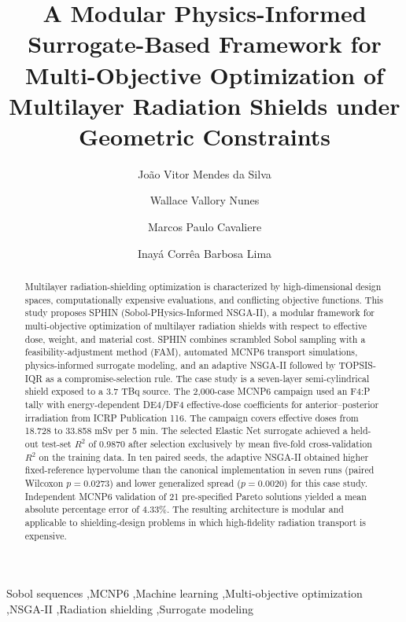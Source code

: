 \documentclass[preprint,12pt]{elsarticle}
\begin{document}
\begin{frontmatter}

\title{A Modular Physics-Informed Surrogate-Based Framework for Multi-Objective Optimization of Multilayer Radiation Shields under Geometric Constraints}

\author[pen]{Jo\~ao Vitor Mendes da Silva}
\author[ime]{Wallace Vallory Nunes}
\author[ime]{Marcos Paulo Cavaliere}
\author[pen]{Inay\'a Corr\^ea Barbosa Lima}

\begin{abstract}
Multilayer radiation-shielding optimization is characterized by high-dimensional design spaces, computationally expensive evaluations, and conflicting objective functions. This study proposes SPHIN (Sobol-PHysics-Informed NSGA-II), a modular framework for multi-objective optimization of multilayer radiation shields with respect to effective dose, weight, and material cost. SPHIN combines scrambled Sobol sampling with a feasibility-adjustment method (FAM), automated MCNP6 transport simulations, physics-informed surrogate modeling, and an adaptive NSGA-II followed by TOPSIS-IQR as a compromise-selection rule. The case study is a seven-layer semi-cylindrical shield exposed to a 3.7 TBq  source. The 2,000-case MCNP6 campaign used an F4:P tally with energy-dependent DE4/DF4 effective-dose coefficients for anterior--posterior irradiation from ICRP Publication 116. The campaign covers effective doses from 18.728 to 33.858 mSv per 5 min. The selected Elastic Net surrogate achieved a held-out test-set $R^2$ of 0.9870 after selection exclusively by mean five-fold cross-validation $R^2$ on the training data. In ten paired seeds, the adaptive NSGA-II obtained higher fixed-reference hypervolume than the canonical implementation in seven runs (paired Wilcoxon $p=0.0273$) and lower generalized spread ($p=0.0020$) for this case study. Independent MCNP6 validation of 21 pre-specified Pareto solutions yielded a mean absolute percentage error of 4.33\%. The resulting architecture is modular and applicable to shielding-design problems in which high-fidelity radiation transport is expensive.
\end{abstract}

\begin{keyword}
Sobol sequences \sep MCNP6 \sep Machine learning \sep Multi-objective optimization \sep NSGA-II \sep Radiation shielding \sep Surrogate modeling
\end{keyword}
\end{frontmatter}
\end{document}
